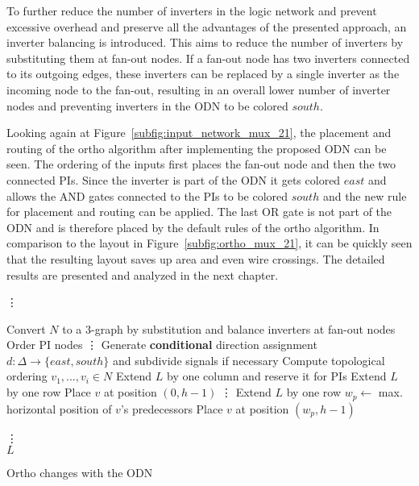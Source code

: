 To further reduce the number of inverters in the logic network and prevent excessive overhead and preserve all the advantages of the presented approach, an inverter balancing is introduced. This aims to reduce the number of inverters by substituting them at fan-out nodes. If a fan-out node has two inverters connected to its outgoing edges, these inverters can be replaced by a single inverter as the incoming node to the fan-out, resulting in an overall lower number of inverter nodes and preventing inverters in the ODN to be colored $south$.

Looking again at Figure~\ref{subfig:input_network_mux_21}, the placement and routing of the ortho algorithm after implementing the proposed ODN can be seen. The ordering of the inputs first places the fan-out node and then the two connected PIs. Since the inverter is part of the ODN it gets colored $east$ and allows the AND gates connected to the PIs to be colored $south$ and the new rule for placement and routing can be applied. The last OR gate is not part of the ODN and is therefore placed by the default rules of the ortho algorithm. In comparison to the layout in Figure~\ref{subfig:ortho_mux_21}, it can be quickly seen that the resulting layout saves up area and even wire crossings. The detailed results are presented and analyzed in the next chapter.

\begin{algorithm}[t!]
	\vdots
	
	\begin{algorithmic}
		\State Convert $N$ to a 3-graph by substitution and balance inverters at fan-out nodes
		\State Order PI nodes
		\State \vdots
		\State Generate \textbf{conditional} direction assignment $d : \Delta \rightarrow \{east, south\}$ and subdivide signals if necessary
		\State Compute topological ordering $v_1, . . . , v_i \in N$
		\State Extend $L$ by one column and reserve it for PIs
		\State Extend $L$ by one row
		\State Place $v$ at position $(0, h - 1)$
		\State \vdots
		\State Extend $L$ by one row
		\EndIf
		\State $w_p \leftarrow$ max. horizontal position of $v$'s predecessors
		\State Place $v$ at position $(w _p, h - 1)$
		\EndIf
		
		\EndFor
		\State \vdots \\
		\Return $L$
	\end{algorithmic}
	\caption{Ortho changes with the ODN}\label{alg:input_network}
\end{algorithm}

